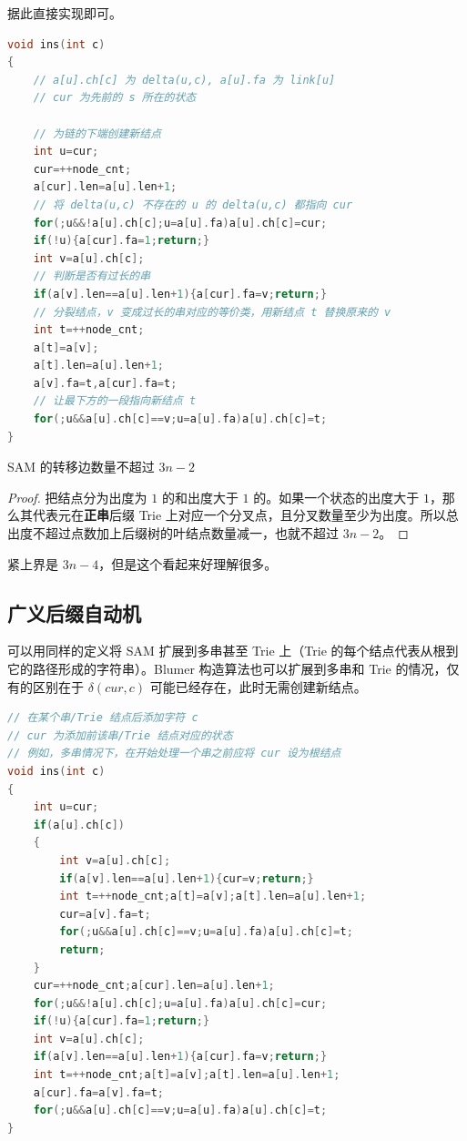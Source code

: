 据此直接实现即可。

\begin{lstlisting}[language=C++, caption=Blumer 算法构建 SAM]
void ins(int c)
{
    // a[u].ch[c] 为 delta(u,c), a[u].fa 为 link[u]
    // cur 为先前的 s 所在的状态

    // 为链的下端创建新结点
    int u=cur;
    cur=++node_cnt;
    a[cur].len=a[u].len+1;
    // 将 delta(u,c) 不存在的 u 的 delta(u,c) 都指向 cur
    for(;u&&!a[u].ch[c];u=a[u].fa)a[u].ch[c]=cur;
    if(!u){a[cur].fa=1;return;}
    int v=a[u].ch[c];
    // 判断是否有过长的串
    if(a[v].len==a[u].len+1){a[cur].fa=v;return;}
    // 分裂结点，v 变成过长的串对应的等价类，用新结点 t 替换原来的 v
    int t=++node_cnt;
    a[t]=a[v];
    a[t].len=a[u].len+1;
    a[v].fa=t,a[cur].fa=t;
    // 让最下方的一段指向新结点 t
    for(;u&&a[u].ch[c]==v;u=a[u].fa)a[u].ch[c]=t;
}
\end{lstlisting}

\begin{theorem}
    SAM 的转移边数量不超过 $3n-2$
\end{theorem}
\begin{proof}
    把结点分为出度为 $1$ 的和出度大于 $1$ 的。如果一个状态的出度大于 $1$，那么其代表元在\textbf{正串}后缀 Trie 上对应一个分叉点，且分叉数量至少为出度。所以总出度不超过点数加上后缀树的叶结点数量减一，也就不超过 $3n-2$。
\end{proof}
\begin{remark}
    紧上界是 $3n-4$，但是这个看起来好理解很多。
\end{remark}

\subsection{广义后缀自动机}

可以用同样的定义将 SAM 扩展到多串甚至 Trie 上（Trie 的每个结点代表从根到它的路径形成的字符串）。Blumer 构造算法也可以扩展到多串和 Trie 的情况，仅有的区别在于 $\delta(cur,c)$ 可能已经存在，此时无需创建新结点。

\begin{lstlisting}[language=C++, caption=Blumer 算法构建广义 SAM]
// 在某个串/Trie 结点后添加字符 c
// cur 为添加前该串/Trie 结点对应的状态
// 例如，多串情况下，在开始处理一个串之前应将 cur 设为根结点
void ins(int c)
{
	int u=cur;
	if(a[u].ch[c])
	{
		int v=a[u].ch[c];
		if(a[v].len==a[u].len+1){cur=v;return;}
		int t=++node_cnt;a[t]=a[v];a[t].len=a[u].len+1;
		cur=a[v].fa=t;
		for(;u&&a[u].ch[c]==v;u=a[u].fa)a[u].ch[c]=t;
		return;
	}
	cur=++node_cnt;a[cur].len=a[u].len+1;
	for(;u&&!a[u].ch[c];u=a[u].fa)a[u].ch[c]=cur;
	if(!u){a[cur].fa=1;return;}
	int v=a[u].ch[c];
	if(a[v].len==a[u].len+1){a[cur].fa=v;return;}
	int t=++node_cnt;a[t]=a[v];a[t].len=a[u].len+1;
	a[cur].fa=a[v].fa=t;
	for(;u&&a[u].ch[c]==v;u=a[u].fa)a[u].ch[c]=t;
}
\end{lstlisting}

